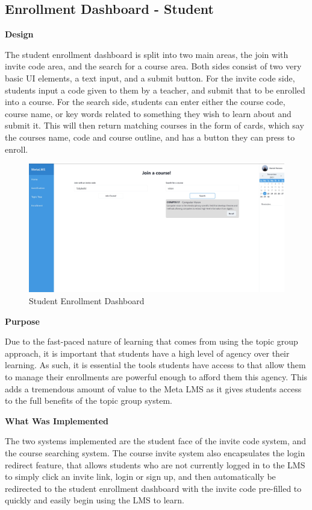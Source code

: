\subsection{Enrollment Dashboard - Student}

\textbf{Design}

The student enrollment dashboard is split into two main areas, the join with invite code area, and the search for a course area. Both sides consist of two very basic UI elements, a text input, and a submit button. For the invite code side, students input a code given to them by a teacher, and submit that to be enrolled into a course. For the search side, students can enter either the course code, course name, or key words related to something they wish to learn about and submit it. This will then return matching courses in the form of cards, which say the courses name, code and course outline, and has a button they can press to enroll.

\begin{figure}[h!]
    \centering
    \includegraphics[scale=0.1]{images/accounts-student-dash.jpg}
    \caption{Student Enrollment Dashboard}
\end{figure}

\textbf{Purpose}

Due to the fast-paced nature of learning that comes from using the topic group approach, it is important that students have a high level of agency over their learning. As such, it is essential the tools students have access to that allow them to manage their enrollments are powerful enough to afford them this agency. This adds a tremendous amount of value to the Meta LMS as it gives students access to the full benefits of the topic group system.

\textbf{What Was Implemented}

The two systems implemented are the student face of the invite code system, and the course searching system. The course invite system also encapsulates the login redirect feature, that allows students who are not currently logged in to the LMS to simply click an invite link, login or sign up, and then automatically be redirected to the student enrollment dashboard with the invite code pre-filled to quickly and easily begin using the LMS to learn.


